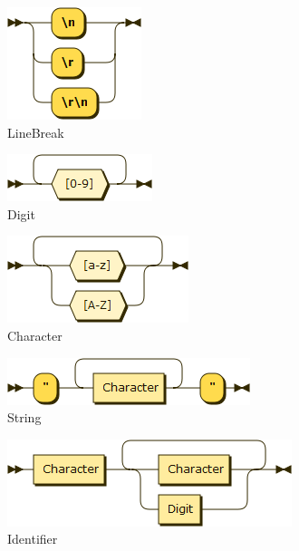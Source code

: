 \begin{figure}[h!]
\centering
\includegraphics[scale=1]{kepek/rr_linebreak.png}
\caption{LineBreak}
\label{fig:rr_linebreak}
\end{figure}

\begin{figure}[h!]
\centering
\includegraphics[scale=1]{kepek/rr_digit.png}
\caption{Digit}
\label{fig:rr_digit}
\end{figure}

\begin{figure}[h!]
\centering
\includegraphics[scale=1]{kepek/rr_character.png}
\caption{Character}
\label{fig:rr_character}
\end{figure}

\begin{figure}[h!]
\centering
\includegraphics[scale=1]{kepek/rr_string.png}
\caption{String}
\label{fig:rr_string}
\end{figure}

\begin{figure}[h!]
\centering
\includegraphics[scale=0.5]{kepek/rr_identifier.png}
\caption{Identifier}
\label{fig:rr_identifier}
\end{figure}

